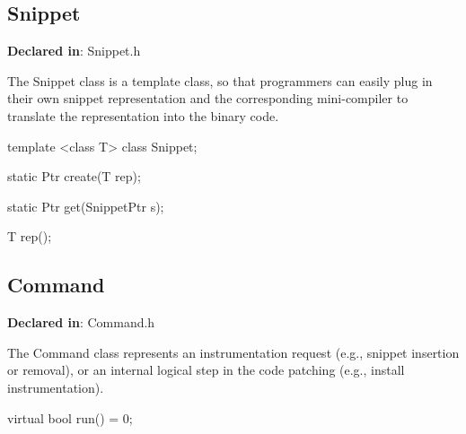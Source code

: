 \subsection{Snippet}
\label{sec-3.2.2}

\textbf{Declared in}: Snippet.h

The Snippet class is a template class, so that programmers can easily plug in
their own snippet representation and the corresponding mini-compiler to
translate the representation into the binary code.


\begin{apient}
template <class T>
class Snippet;

\end{apient}



\begin{apient}
static Ptr create(T rep);
\end{apient}



\begin{apient}
static Ptr get(SnippetPtr s);
\end{apient}



\begin{apient}
T rep();
\end{apient}



\subsection{Command}
\label{sec-3.2.3}

\textbf{Declared in}: Command.h

The Command class represents an instrumentation request (e.g., snippet insertion
or removal), or an internal logical step in the code patching (e.g., install
instrumentation).


\begin{apient}
virtual bool run() = 0;
\end{apient}


